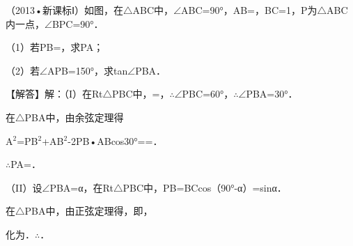 \begin{question}
（2013•新课标Ⅰ）如图，在$\triangle$ABC中，$\angle$ABC=90°，AB=\allowbreak{}，BC=1，P为$\triangle$ABC内一点，$\angle$BPC=90°．\par
（1）若PB=\allowbreak{}，求PA；\par
（2）若$\angle$APB=150°，求tan$\angle$PBA．\par
\begin{center}
\allowbreak{}
\end{center}
\begin{solution}
【解答】解：（I）在Rt$\triangle$PBC中，\allowbreak{}=\allowbreak{}，$\therefore$$\angle$PBC=60°，$\therefore$$\angle$PBA=30°．\par
在$\triangle$PBA中，由余弦定理得\par
A$^{2}$=PB$^{2}$+AB$^{2}$-2PB•ABcos30°=\allowbreak{}=\allowbreak{}．\par
$\therefore$PA=\allowbreak{}．\par
（II）设$\angle$PBA=α，在Rt$\triangle$PBC中，PB=BCcos（90°-α）=sinα．\par
在$\triangle$PBA中，由正弦定理得\allowbreak{}，即\allowbreak{}，\par
化为\allowbreak{}．$\therefore$\allowbreak{}．\par
\end{solution}
\end{question}


